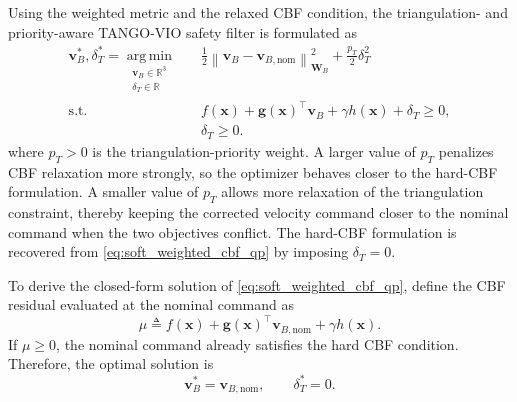 \documentclass[journal]{IEEEtran}
\newcommand{\R}{\mathbb{R}}
\begin{document}
Using the weighted metric and the relaxed CBF condition, the triangulation- and priority-aware TANGO-VIO safety filter is formulated as
\begin{equation}
  \begin{aligned}
  \bm{v}_{B}^{*},\delta_T^{*}
  =
  \underset{\substack{\bm{v}_{B}\in\R^{3}\\\delta_T\in\R}}{\operatorname{arg\,min}}
  &\quad
  \frac{1}{2}
  \left\|
  \bm{v}_{B}-\bm{v}_{B,\mathrm{nom}}
  \right\|_{\bm{W}_{B}}^{2}
  +
  \frac{p_T}{2}\delta_T^{2}\\
  \mathrm{s.t.}
  &\quad
  f(\bm{x})+\bm{g}(\bm{x})^{\top}\bm{v}_{B}
  +\gamma h(\bm{x})+\delta_T\ge0,\\
  &\quad
  \delta_T\ge0.
  \end{aligned}
  \label{eq:soft_weighted_cbf_qp}
\end{equation}
where $p_T>0$ is the triangulation-priority weight. A larger value of $p_T$ penalizes CBF relaxation more strongly, so the optimizer behaves closer to the hard-CBF formulation. A smaller value of $p_T$ allows more relaxation of the triangulation constraint, thereby keeping the corrected velocity command closer to the nominal command when the two objectives conflict. The hard-CBF formulation is recovered from \eqref{eq:soft_weighted_cbf_qp} by imposing $\delta_T=0$.

To derive the closed-form solution of \eqref{eq:soft_weighted_cbf_qp}, define the CBF residual evaluated at the nominal command as
\begin{equation}
  \mu \triangleq f(\bm{x}) + \bm{g}(\bm{x})^{\top}\bm{v}_{B,\mathrm{nom}} + \gamma h(\bm{x}).
  \label{eq:soft_mu_def}
\end{equation}
If $\mu\ge0$, the nominal command already satisfies the hard CBF condition. Therefore, the optimal solution is
\begin{equation}
  \bm{v}_{B}^{*}=\bm{v}_{B,\mathrm{nom}},
  \qquad
  \delta_T^{*}=0.
  \label{eq:soft_inactive_solution}
\end{equation}
\end{document}
